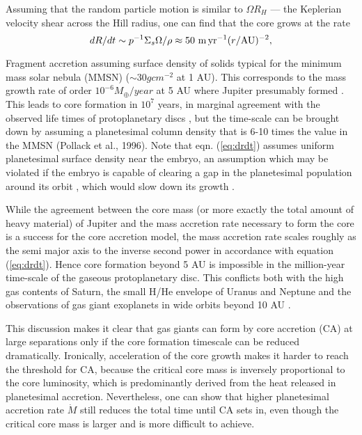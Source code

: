 Assuming that the random particle motion is similar to $\Omega R_H$ — the Keplerian velocity shear across the Hill 
radius, one can find that the core grows at the rate \citep{Dones1993}
\begin{equation}
dR/dt\sim p^{-1}\Sigma_s\Omega/\rho\approx 50\,\,{\rm m\, yr}^{-1}(r/{\rm AU})^{-2},
\label{eq:drdt}
\end{equation}

Fragment accretion assuming surface density of solids typical for the minimum mass solar nebula (MMSN) ($\sim 30 g cm^{−2}$ at 1 AU). 
This corresponds to the mass growth rate of order $10^{−6} M_\oplus /year$ at 5 AU where Jupiter
presumably formed \citep{Dodson-Robinson2009}. This leads to core formation in $10^7$ years, in marginal agreement
with the observed life times of protoplanetary discs \citep{Haisch2001}, but the time-scale can be brought down by 
assuming a planetesimal column density that is 6-10 times the value in the MMSN (Pollack et al., 1996). Note that
eqn. (\ref{eq:drdt}) assumes uniform planetesimal surface density near the embryo, an assumption which may be violated if
the embryo is capable of clearing a gap in the planetesimal population around its orbit \citep{Tanaka1997, Rafikov2001, Rafikov2003a}, which would slow down its growth \citep{Rafikov2003b}. 

While the agreement between the core mass (or more exactly the total amount of heavy material) of Jupiter and 
the mass accretion rate necessary to form the core is a success
for the core accretion model, the mass accretion rate scales roughly as the semi major axis to the inverse second power
in accordance with equation (\ref{eq:drdt}). Hence core formation beyond 5 AU is impossible in the million-year time-scale of
the gaseous protoplanetary disc. This conflicts both with the high gas contents of Saturn, the small H/He envelope of
Uranus and Neptune and the observations of gas giant exoplanets in wide orbits beyond 10 AU \citep{Marois2008}.

This discussion makes it clear that gas giants can form by core accretion (CA) at large separations only if the core formation timescale
can be reduced dramatically. Ironically, acceleration of the core growth makes it harder to reach the threshold for CA,
because the critical core mass is inversely proportional to the core luminosity, which is predominantly derived from
the heat released in planetesimal accretion. Nevertheless, one can show \citep{Rafikov2011} that higher planetesimal 
accretion rate $\dot{M}$ still reduces the total time until CA sets in, even though the critical core mass is larger and is more 
difficult to achieve.

